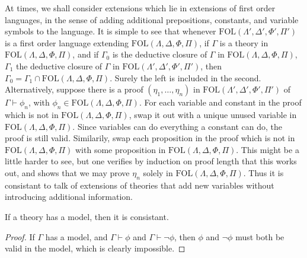 At times, we shall consider extensions which lie in extensions of first order languages, in the sense of adding additional prepositions, constants, and variable symbols to the language. It is simple to see that whenever $\text{FOL}(\Lambda',\Delta',\Phi',\Pi')$ is a first order language extending $\text{FOL}(\Lambda,\Delta,\Phi,\Pi)$, if $\Gamma$ is a theory in $\text{FOL}(\Lambda,\Delta,\Phi,\Pi)$, and if $\Gamma_0$ is the deductive closure of $\Gamma$ in $\text{FOL}(\Lambda,\Delta,\Phi,\Pi)$, $\Gamma_1$ the deductive closure of $\Gamma$ in $\text{FOL}(\Lambda',\Delta',\Phi',\Pi')$, then $\Gamma_0 = \Gamma_1 \cap \text{FOL}(\Lambda,\Delta,\Phi,\Pi)$. Surely the left is included in the second. Alternatively, suppose there is a proof $(\eta_1, \dots, \eta_n)$ in $\text{FOL}(\Lambda',\Delta',\Phi',\Pi')$ of $\Gamma \vdash \phi_n$, with $\phi_n \in \text{FOL}(\Lambda,\Delta,\Phi,\Pi)$. For each variable and constant in the proof which is not in $\text{FOL}(\Lambda,\Delta,\Phi,\Pi)$, swap it out with a unique unused variable in $\text{FOL}(\Lambda,\Delta,\Phi,\Pi)$. Since variables can do everything a constant can do, the proof is still valid. Similarily, swap each proposition in the proof which is not in $\text{FOL}(\Lambda,\Delta,\Phi,\Pi)$ with some proposition in $\text{FOL}(\Lambda,\Delta,\Phi,\Pi)$. This might be a little harder to see, but one verifies by induction on proof length that this works out, and shows that we may prove $\eta_n$ solely in $\text{FOL}(\Lambda,\Delta,\Phi,\Pi)$. Thus it is consistant to talk of extensions of theories that add new variables without introducing additional information.

\begin{lemma}
    If a theory has a model, then it is consistant.
\end{lemma}
\begin{proof}
    If $\Gamma$ has a model, and $\Gamma \vdash \phi$ and $\Gamma \vdash \neg \phi$, then $\phi$ and $\neg \phi$ must both be valid in the model, which is clearly impossible.
\end{proof}


